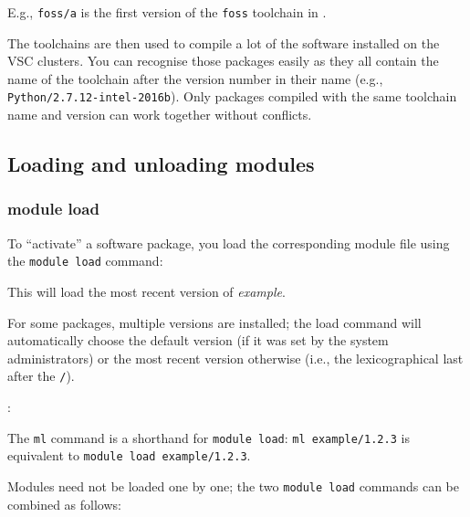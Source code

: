 E.g., \texttt{foss/\the\year{}a} is the first version of the \lstinline|foss| toolchain in \the\year.

The toolchains are then used to compile a lot of the software installed on
the VSC clusters. You can recognise those packages easily as they all contain the
name of the toolchain after the version number in their name (e.g., \lstinline|Python/2.7.12-intel-2016b|).
Only packages compiled with the same toolchain name and version can work together without conflicts.

\subsection{Loading and unloading modules}
\label{subsec:activating-and-deactivating-modules}

\subsubsection{module load}

To ``activate'' a software package, you load the corresponding module file
using the \lstinline|module load| command:

\begin{prompt}
\end{prompt}

This will load the most recent version of \emph{example}.

For some packages, multiple versions are installed; the load
command will automatically choose the default version (if it was set by the
system administrators) or the most recent version otherwise (i.e., the
lexicographical last after the \lstinline|/|).

:

\begin{prompt}
\end{prompt}

\ifusinglmod
The \lstinline|ml| command is a shorthand for \lstinline|module load|:
\lstinline|ml example/1.2.3| is equivalent to \lstinline|module load example/1.2.3|.
\fi

Modules need not be loaded one by one; the two \lstinline|module load| commands can be
combined as follows:

\begin{prompt}
\end{prompt}

